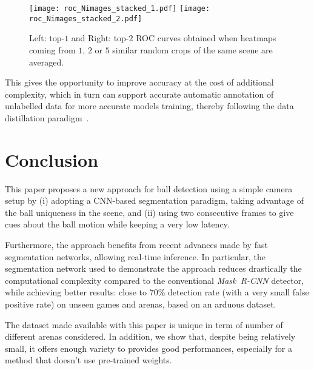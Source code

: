 \documentclass[sigconf, screen]{acmart}
\begin{document}
\begin{figure}
    \begin{center}
    \texttt{[image: roc\_Nimages\_stacked\_1.pdf]}\hspace{2em}
    \texttt{[image: roc\_Nimages\_stacked\_2.pdf]}
    \caption{Left: top-$1$ and Right: top-$2$ ROC curves obtained when heatmaps coming from $1$, $2$ or $5$ similar random crops of the same scene are averaged.}
    \label{fig:roc_multiple_images}
    \end{center}
\end{figure}


This gives the opportunity to improve accuracy at the cost of additional complexity, which in turn can support accurate automatic annotation of unlabelled data for more accurate models training, thereby following the data distillation paradigm~\cite{Radosavovic2018}.



\section{Conclusion}
\label{sec:conclusion}

This paper proposes a new approach for ball detection using a simple camera setup by (i) adopting a CNN-based segmentation paradigm, taking advantage of the ball uniqueness in the scene, and (ii) using two consecutive frames to give cues about the ball motion while keeping a very low latency.

Furthermore, the approach benefits from recent advances made by fast segmentation networks, allowing real-time inference.
In particular, the segmentation network used to demonstrate the approach reduces drastically the computational complexity compared to the conventional \emph{Mask~R-CNN} detector, while achieving better results: close to $70\%$ detection rate (with a very small false positive rate) on unseen games and arenas, based on an arduous dataset.

The dataset made available with this paper is unique in term of number of different arenas considered. In addition, we show that, despite being relatively small, it offers enough variety to provides good performances, especially for a method that doesn't use pre-trained weights.
\end{document}
